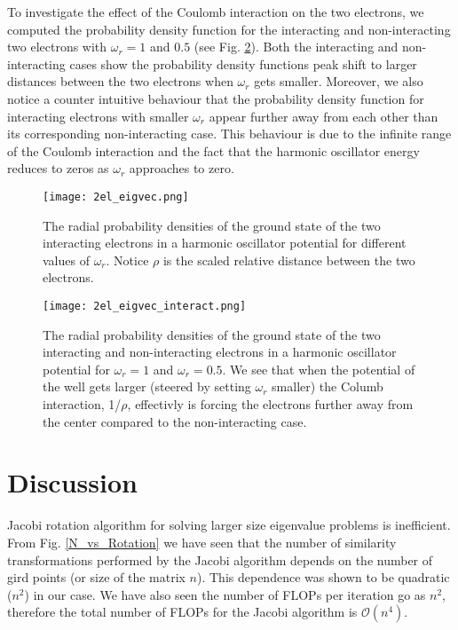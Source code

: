 \documentclass[a4paper]{article}
\begin{document}
To investigate the effect of the Coulomb interaction on the two electrons, we computed the probability density function for the interacting and non-interacting two electrons with $\omega_r = 1$ and $0.5$ (see Fig. \ref{2el_eigvec_interact}). Both the interacting and non-interacting cases show the probability density functions peak shift to larger distances between the two electrons when $\omega_r$ gets smaller. Moreover, we also notice a counter intuitive behaviour that the probability density function for interacting electrons with smaller $\omega_r$ appear further away from each other than its corresponding non-interacting case. This behaviour is due to the infinite range of the Coulomb interaction and the fact that the harmonic oscillator energy reduces to zeros as $\omega_r$ approaches to zero.

\begin{figure}[H]
  \centering
  \texttt{[image: 2el\_eigvec.png]}
  \caption{The radial probability densities of the ground state of the two interacting electrons in a harmonic oscillator potential for different values of $\omega_r$. Notice $\rho$ is the scaled relative distance between the two electrons.}
   \label{2el_eigvec}
\end{figure}
\begin{figure}[H]
  \centering
  \texttt{[image: 2el\_eigvec\_interact.png]}
  \caption{The radial probability densities of the ground state of the two interacting and non-interacting electrons in a harmonic oscillator potential for $\omega_r=1$ and $\omega_r=0.5$. We see that when the potential of the well gets larger (steered by setting $\omega_r$ smaller) the Columb interaction, 1/$\rho$, effectivly is forcing the electrons further away from the center compared to the non-interacting case.}
   \label{2el_eigvec_interact}
\end{figure}
\section{Discussion}
Jacobi rotation algorithm for solving larger size eigenvalue problems is inefficient. From Fig. \ref{N_vs_Rotation} we have seen that the number of similarity transformations performed by the Jacobi algorithm depends on the number of gird points (or size of the matrix $n$). This dependence was shown to be quadratic ($n^2$) in our case. We have also seen the number of FLOPs per iteration go as $n^2$, therefore the total number of FLOPs for the Jacobi algorithm is $\mathcal{O}(n^4)$. 
\end{document}
